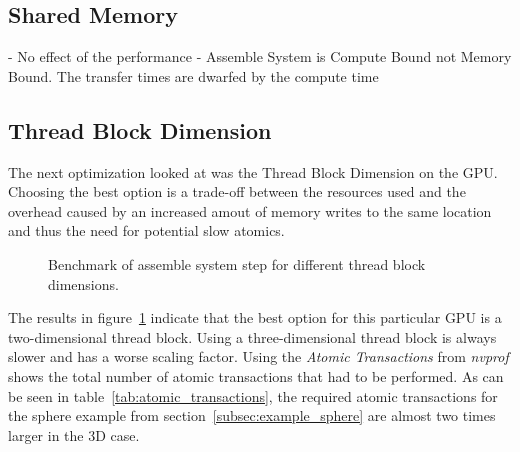 \documentclass[a4paper,11pt]{kth-mag}
\begin{document}
\subsection{Shared Memory}

- No effect of the performance
- Assemble System is Compute Bound not Memory Bound. The transfer times are dwarfed by the compute time

\subsection{Thread Block Dimension}

The next optimization looked at was the Thread Block Dimension on the GPU. Choosing the best option is a trade-off between the resources used and the overhead caused by an increased amout of memory writes to the same location and thus the need for potential slow atomics.

\begin{figure}[!htbp]
  \centering
  \caption{Benchmark of assemble system step for different thread block dimensions.}
  \label{fig:bench_cuda_thread_blocks}
\end{figure}

The results in figure~\ref{fig:bench_cuda_thread_blocks} indicate that the best option for this particular GPU is a two-dimensional thread block. Using a three-dimensional thread block is always slower and has a worse scaling factor. Using the \emph{Atomic Transactions} from \emph{nvprof} shows the total number of atomic transactions that had to be performed. As can be seen in table~\ref{tab:atomic_transactions}, the required atomic transactions for the sphere example from section~\ref{subsec:example_sphere} are almost two times larger in the 3D case.
\end{document}
